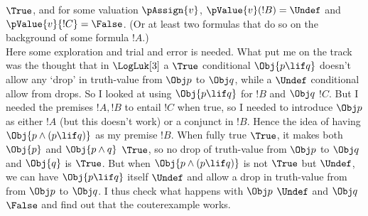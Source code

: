 \documentclass[../../../../include/open-logic-section]{subfiles}
\begin{document}
\begin{prob}
\begin{ans}
\begin{enumerate}
{	$\True$, and for some valuation $\pAssign{v}$, $\pValue{v}(!B)=\Undef$
	and $\pValue{v}{!C}=\False$. (Or at least two formulas that do so on the 
	background of some formula $!A$.)\\
	Here some exploration and trial and error is needed. What put me on the
	track was the thought that in $\LogLuk[3]$ a $\True$ conditional $\Obj{p \lif q}$
	doesn't allow any `drop' in truth-value from $\Obj p$ to $\Obj q$, while a $\Undef$
	conditional allow from drops. So I looked at using $\Obj{p \lif q}$ for $!B$ and $\Obj q$ $!C$. But I needed the premises $!A, !B$ to entail $!C$ when true, so I needed to introduce $\Obj p$ as either $!A$ (but this doesn't work) or a conjunct in $!B$. Hence the idea of having $\Obj{p \land (p \lif q)}$ as my premise $!B$. When fully true $\True$, it makes both $\Obj{p}$ and $\Obj{p \land q}$ $\True$, so 
	no drop of truth-value from $\Obj p$ to $\Obj q$ and $\Obj{q}$ is $\True$. But when $\Obj{p \land (p \lif q)}$ is not $\True$ but $\Undef$, we can have $\Obj{p \lif q}$ itself $\Undef$ and allow a drop in truth-value from from $\Obj p$ to $\Obj q$. I thus check what happens with $\Obj p$ $\Undef$ and $\Obj q$ $\False$ and 
	find out that the couterexample works.}
\end{enumerate}
\end{ans}
\end{prob}
\end{document}
